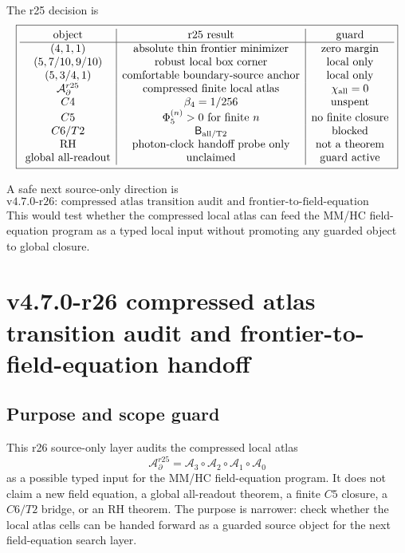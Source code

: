 The r25 decision is
\[
\boxed{
\begin{array}{c|c|c}
\text{object} & \text{r25 result} & \text{guard}\\
\hline
(4,1,1) & \text{absolute thin frontier minimizer} & \text{zero margin}\\
(5,7/10,9/10) & \text{robust local box corner} & \text{local only}\\
(5,3/4,1) & \text{comfortable boundary-source anchor} & \text{local only}\\
\mathcal A_{\partial}^{r25} & \text{compressed finite local atlas} & \chi_{\rm all}=0\\
C4 & \beta_4=1/256 & \text{unspent}\\
C5 & \Phi_5^{(n)}>0\text{ for finite }n & \text{no finite closure}\\
C6/T2 & \mathsf B_{\rm all/T2} & \text{blocked}\\
\text{RH} & \text{photon-clock handoff probe only} & \text{not a theorem}\\
\text{global all-readout} & \text{unclaimed} & \text{guard active}
\end{array}
}
\]

A safe next source-only direction is
\[
\boxed{
\text{v4.7.0-r26: compressed atlas transition audit and frontier-to-field-equation handoff.}
}
\]
This would test whether the compressed local atlas can feed the MM/HC
field-equation program as a typed local input without promoting any guarded
object to global closure.




\section{v4.7.0-r26 compressed atlas transition audit and frontier-to-field-equation handoff}
\label{sec:v470-r26-atlas-transition-field-handoff}

\subsection{Purpose and scope guard}
\label{subsec:v470-r26-purpose-scope}

This r26 source-only layer audits the compressed local atlas
\[
\mathcal A_{\partial}^{r25}
=
\mathcal A_3\circ\mathcal A_2\circ\mathcal A_1\circ\mathcal A_0
\]
as a possible typed input for the MM/HC field-equation program.  It does not
claim a new field equation, a global all-readout theorem, a finite \(C5\)
closure, a \(C6/T2\) bridge, or an RH theorem.  The purpose is narrower: check
whether the local atlas cells can be handed forward as a guarded source object
for the next field-equation search layer.

